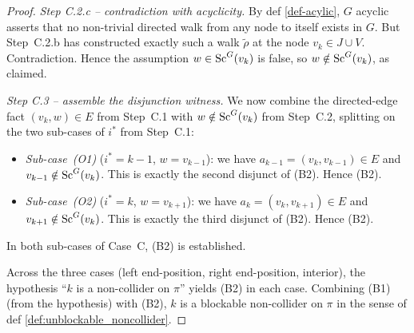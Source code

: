 \documentclass[main]{subfiles}
\begin{document}
\begin{proof}
\smallskip\noindent\emph{Step C.2.c -- contradiction with acyclicity.}
By def \ref{def-acylic}, $G$ acyclic asserts that no non-trivial directed walk from any node to itself exists in $G$. But Step~C.2.b has constructed exactly such a walk $\widetilde{\rho}$ at the node $v_k \in J \cup V$. Contradiction. Hence the assumption $w \in \mathrm{Sc}^G(v_k)$ is false, so $w \notin \mathrm{Sc}^G(v_k)$, as claimed.

\smallskip\noindent\emph{Step C.3 -- assemble the disjunction witness.}
We now combine the directed-edge fact $(v_k, w) \in E$ from Step~C.1 with $w \notin \mathrm{Sc}^G(v_k)$ from Step~C.2, splitting on the two sub-cases of $i^*$ from Step~C.1:
\begin{itemize}
    \item \emph{Sub-case~(O1)} ($i^* = k - 1$, $w = v_{k - 1}$): we have $a_{k - 1} = (v_k, v_{k - 1}) \in E$ and $v_{k - 1} \notin \mathrm{Sc}^G(v_k)$. This is exactly the second disjunct of (B2). Hence (B2).
    \item \emph{Sub-case~(O2)} ($i^* = k$, $w = v_{k + 1}$): we have $a_k = (v_k, v_{k + 1}) \in E$ and $v_{k + 1} \notin \mathrm{Sc}^G(v_k)$. This is exactly the third disjunct of (B2). Hence (B2).
\end{itemize}
In both sub-cases of Case~C, (B2) is established.

\medskip
Across the three cases (left end-position, right end-position, interior), the hypothesis ``$k$ is a non-collider on $\pi$'' yields (B2) in each case. Combining (B1) (from the hypothesis) with (B2), $k$ is a blockable non-collider on $\pi$ in the sense of def \ref{def:unblockable_noncollider}.
\end{proof}
\end{document}

